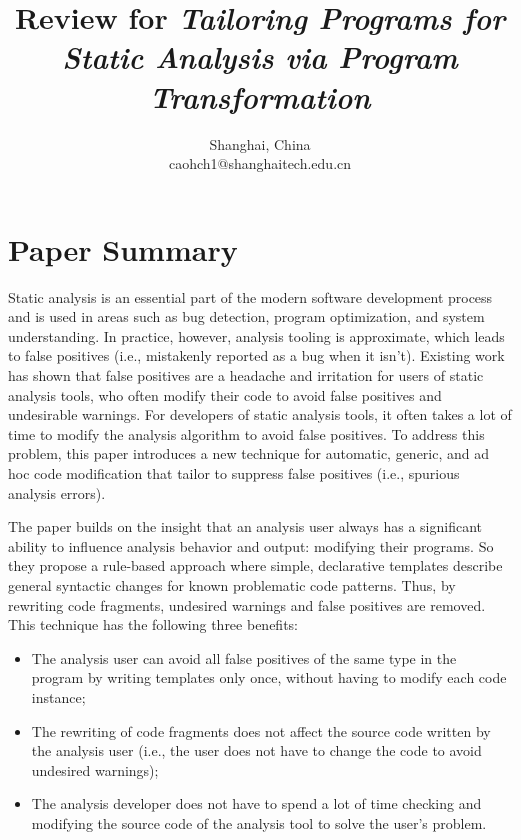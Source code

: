 \documentclass[conference]{IEEEtran}
\begin{document}
\title{Review for \textit{Tailoring Programs for Static Analysis via Program Transformation}}


\author{
Shanghai, China\\
caohch1@shanghaitech.edu.cn}

\maketitle

\section{Paper Summary}
Static analysis is an essential part of the modern software development process and is used in areas such as bug detection, program optimization, and system understanding. In practice, however, analysis tooling is approximate, which leads to false positives (i.e., mistakenly reported as a bug when it isn't). Existing work has shown that false positives are a headache and irritation for users of static analysis tools, who often modify their code to avoid false positives and undesirable warnings. For developers of static analysis tools, it often takes a lot of time to modify the analysis algorithm to avoid false positives. To address this problem, this paper introduces a new technique for automatic, generic, and ad hoc code modification that tailor to suppress false positives (i.e., spurious analysis errors).

The paper builds on the insight that an analysis user always has a significant ability to influence analysis behavior and output: modifying their programs. So they propose a rule-based approach where simple, declarative templates describe general syntactic changes for known problematic code patterns. Thus, by rewriting code fragments, undesired warnings and false positives are removed. This technique has the following three benefits:
\begin{itemize}
    \item The analysis user can avoid all false positives of the same type in the program by writing templates only once, without having to modify each code instance;
    \item The rewriting of code fragments does not affect the source code written by the analysis user (i.e., the user does not have to change the code to avoid undesired warnings);
    \item The analysis developer does not have to spend a lot of time checking and modifying the source code of the analysis tool to solve the user's problem.
\end{itemize}
\end{document}
